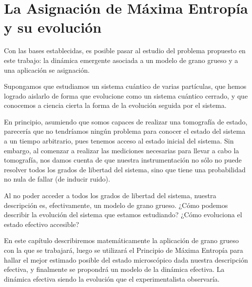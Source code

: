 \chapter{La Asignación de Máxima Entropía y su evolución}\label{ch:3}


Con las bases establecidas, es posible pasar al estudio del problema propuesto en este trabajo: la dinámica emergente asociada a un modelo de grano grueso y a una aplicación se asignación.

Supongamos que estudiamos un sistema cuántico de varias partículas, que hemos logrado aislarlo de forma que evolucione como un sistema cuántico cerrado, y que conocemos a ciencia cierta la forma de la evolución seguida por el sistema.

En principio, asumiendo que somos capaces de realizar una tomografía de estado, parecería que no tendríamos ningún problema para conocer el estado del sistema a un tiempo arbitrario, pues tenemos acceso al estado inicial del sistema. Sin embargo, al comenzar a realizar las mediciones necesarias para llevar a cabo la tomografía, nos damos cuenta de que nuestra instrumentación no sólo no puede resolver todos los grados de libertad del sistema, sino que tiene una probabilidad no nula de fallar (de inducir ruido).

Al no poder acceder a todos los grados de libertad del sistema, nuestra descripción es, efectivamente, un modelo de grano grueso. ¿Cómo podemos describir la evolución del sistema que estamos estudiando? ¿Cómo evoluciona el estado efectivo accesible?

En este capítulo describiremos matemáticamente la aplicación de grano grueso con la que se trabajará, luego se utilizará el Principio de Máxima Entropía para hallar el mejor estimado posible del estado microscópico dada nuestra descripción efectiva, y finalmente se propondrá un modelo de la dinámica efectiva. La dinámica efectiva siendo la evolución que el experimentalista observaría.





\newpage
